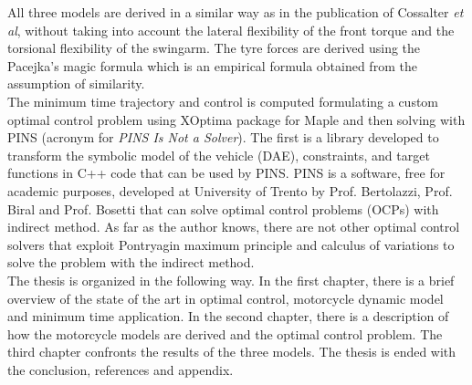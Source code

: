 All three models are derived in a similar way as in the publication of Cossalter \textit{et al}\cite{cossalter2007influence}, without taking into account the lateral flexibility of the front torque and the torsional flexibility of the swingarm. The tyre forces are derived using the Pacejka's magic formula \cite{pacejka2006tyre} which is an empirical formula obtained from the assumption of similarity.\\
The minimum time trajectory and control is computed formulating a custom optimal control problem using XOptima package for Maple and then solving with PINS (acronym for \textit{PINS Is Not a Solver}). The first is a library developed to transform the symbolic model of the vehicle (DAE), constraints, and target functions in C++ code that can be used by PINS. PINS is a software, free for academic purposes, developed at University of Trento by Prof. Bertolazzi, Prof. Biral and Prof. Bosetti that can solve optimal control problems (OCPs) with indirect method. As far as the author knows, there are not other optimal control solvers that exploit Pontryagin maximum principle and calculus of variations to solve the problem with the indirect method. \cite{bertolazzi2006symbolic}\\
The thesis is organized in the following way. 
In the first chapter, there is a brief overview of the state of the art in optimal control, motorcycle dynamic model and minimum time application.
In the second chapter, there is a description of how the motorcycle models are derived and the optimal control problem.
The third chapter confronts the results of the three models.
The thesis is ended with the conclusion, references and appendix.